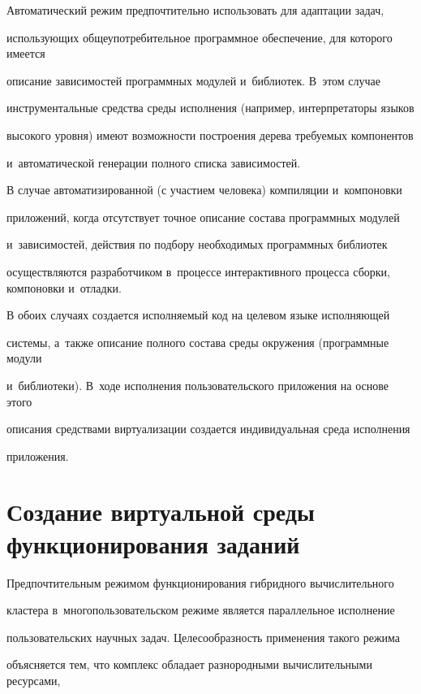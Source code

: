       

      Автоматический режим предпочтительно использовать для адаптации задач, 

использующих общеупотребительное программное обеспечение, для которого имеется 

описание зависимостей программных модулей и~библиотек. В~этом случае 

инструментальные средства среды исполнения (например, интерпретаторы языков 

высокого уровня) имеют возможности построения дерева требуемых компонентов 

и~автоматической генерации полного списка зависимостей.

      

      В случае автоматизированной (с участием человека) компиляции и~компоновки 

приложений, когда отсутствует точное описание состава программных модулей 

и~зависимостей, действия по подбору необходимых программных библиотек 

осуществляются разработчиком в~процессе интерактивного процесса сборки, компоновки и~отладки.

      

      В обоих случаях создается исполняемый код на целевом языке исполняющей 

системы, а~также описание полного состава среды окружения (программные модули 

и~библиотеки). В~ходе исполнения пользовательского приложения на основе этого 

описания средствами виртуализации создается индивидуальная среда исполнения 

приложения.

      

\section{Создание виртуальной среды функционирования заданий}



      Предпочтительным режимом функционирования гибридного вычислительного 

кластера в~многопользовательском режиме является параллельное исполнение 

пользовательских научных задач. Целесообразность применения такого режима 

объясняется тем, что комплекс обладает разнородными вычислительными ресурсами, 

